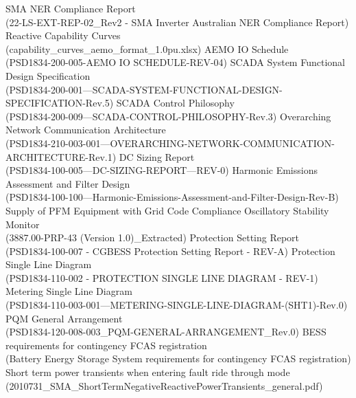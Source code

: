 \renewcommand\bibname{References}

\begin{thebibliography}{99}
	SMA NER Compliance Report\\
	(22-LS-EXT-REP-02_Rev2 - SMA Inverter Australian NER Compliance Report)
	Reactive Capability Curves\\
	(capability_curves_aemo_format_1.0pu.xlsx)
	AEMO IO Schedule\\
	(PSD1834-200-005-AEMO IO SCHEDULE-REV-04)
	SCADA System Functional Design Specification\\
	(PSD1834-200-001---SCADA-SYSTEM-FUNCTIONAL-DESIGN-SPECIFICATION-Rev.5)
	SCADA Control Philosophy\\
	(PSD1834-200-009---SCADA-CONTROL-PHILOSOPHY-Rev.3)
	Overarching Network Communication Architecture\\
	(PSD1834-210-003-001---OVERARCHING-NETWORK-COMMUNICATION-ARCHITECTURE-Rev.1)
	DC Sizing Report\\
	(PSD1834-100-005---DC-SIZING-REPORT---REV-0)
	Harmonic Emissions Assessment and Filter Design\\
	(PSD1834-100-100---Harmonic-Emissions-Assessment-and-Filter-Design-Rev-B)
	Supply of PFM Equipment with Grid Code Compliance Oscillatory Stability Monitor\\
	(3887.00-PRP-43 (Version 1.0)_Extracted)
	Protection Setting Report\\
	(PSD1834-100-007 - CGBESS Protection Setting Report - REV-A)
	Protection Single Line Diagram\\
	(PSD1834-110-002 - PROTECTION SINGLE LINE DIAGRAM - REV-1)
	Metering Single Line Diagram\\
	(PSD1834-110-003-001---METERING-SINGLE-LINE-DIAGRAM-(SHT1)-Rev.0)
	PQM General Arrangement\\
	(PSD1834-120-008-003_PQM-GENERAL-ARRANGEMENT_Rev.0)
	BESS requirements for contingency FCAS registration\\
	(Battery Energy Storage System requirements for contingency FCAS registration)
	Short term power transients when entering fault ride through mode\\
	(2010731_SMA_ShortTermNegativeReactivePowerTransients_general.pdf)

\end{thebibliography}
